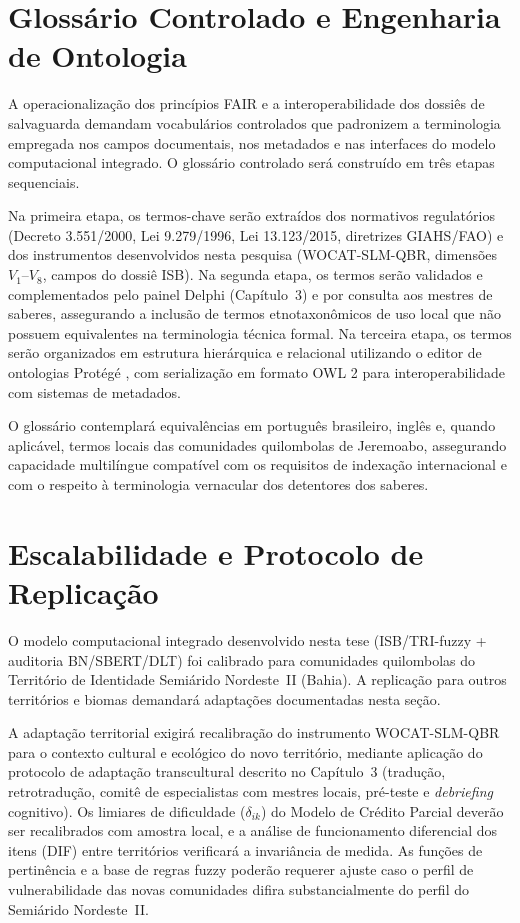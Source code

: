 \section{Glossário Controlado e Engenharia de Ontologia}
\label{sec:glossario_geral}

A operacionalização dos princípios FAIR e a interoperabilidade dos dossiês de salvaguarda demandam vocabulários controlados que padronizem a terminologia empregada nos campos documentais, nos metadados e nas interfaces do modelo computacional integrado. O glossário controlado será construído em três etapas sequenciais.

Na primeira etapa, os termos-chave serão extraídos dos normativos regulatórios (Decreto 3.551/2000, Lei 9.279/1996, Lei 13.123/2015, diretrizes GIAHS/FAO) e dos instrumentos desenvolvidos nesta pesquisa (WOCAT-SLM-QBR, dimensões $V_1$--$V_8$, campos do dossiê ISB). Na segunda etapa, os termos serão validados e complementados pelo painel Delphi (Capítulo~3) e por consulta aos mestres de saberes, assegurando a inclusão de termos etnotaxonômicos de uso local que não possuem equivalentes na terminologia técnica formal. Na terceira etapa, os termos serão organizados em estrutura hierárquica e relacional utilizando o editor de ontologias Protégé \cite{Musen2015}, com serialização em formato OWL 2 para interoperabilidade com sistemas de metadados.

O glossário contemplará equivalências em português brasileiro, inglês e, quando aplicável, termos locais das comunidades quilombolas de Jeremoabo, assegurando capacidade multilíngue compatível com os requisitos de indexação internacional e com o respeito à terminologia vernacular dos detentores dos saberes.


\section{Escalabilidade e Protocolo de Replicação}
\label{sec:escalabilidade_geral}

O modelo computacional integrado desenvolvido nesta tese (ISB/TRI-fuzzy + auditoria BN/SBERT/DLT) foi calibrado para comunidades quilombolas do Território de Identidade Semiárido Nordeste~II (Bahia). A replicação para outros territórios e biomas demandará adaptações documentadas nesta seção.

A adaptação territorial exigirá recalibração do instrumento WOCAT-SLM-QBR para o contexto cultural e ecológico do novo território, mediante aplicação do protocolo de adaptação transcultural descrito no Capítulo~3 (tradução, retrotradução, comitê de especialistas com mestres locais, pré-teste e \textit{debriefing} cognitivo). Os limiares de dificuldade ($\delta_{ik}$) do Modelo de Crédito Parcial deverão ser recalibrados com amostra local, e a análise de funcionamento diferencial dos itens (DIF) entre territórios verificará a invariância de medida. As funções de pertinência e a base de regras fuzzy poderão requerer ajuste caso o perfil de vulnerabilidade das novas comunidades difira substancialmente do perfil do Semiárido Nordeste~II.

